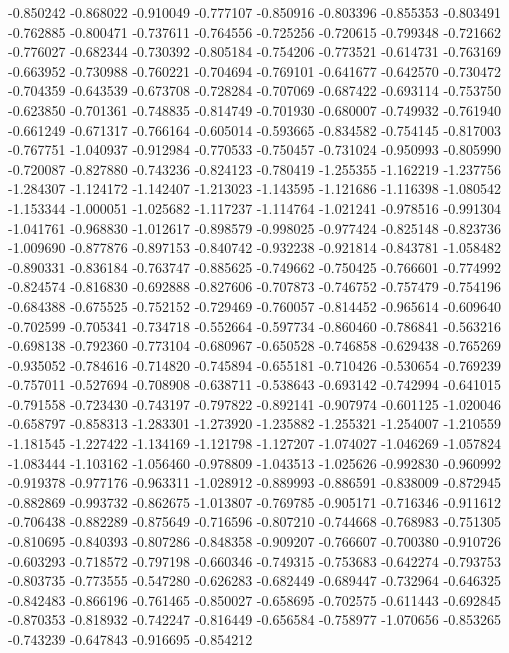 -0.850242
-0.868022
-0.910049
-0.777107
-0.850916
-0.803396
-0.855353
-0.803491
-0.762885
-0.800471
-0.737611
-0.764556
-0.725256
-0.720615
-0.799348
-0.721662
-0.776027
-0.682344
-0.730392
-0.805184
-0.754206
-0.773521
-0.614731
-0.763169
-0.663952
-0.730988
-0.760221
-0.704694
-0.769101
-0.641677
-0.642570
-0.730472
-0.704359
-0.643539
-0.673708
-0.728284
-0.707069
-0.687422
-0.693114
-0.753750
-0.623850
-0.701361
-0.748835
-0.814749
-0.701930
-0.680007
-0.749932
-0.761940
-0.661249
-0.671317
-0.766164
-0.605014
-0.593665
-0.834582
-0.754145
-0.817003
-0.767751
-1.040937
-0.912984
-0.770533
-0.750457
-0.731024
-0.950993
-0.805990
-0.720087
-0.827880
-0.743236
-0.824123
-0.780419
-1.255355
-1.162219
-1.237756
-1.284307
-1.124172
-1.142407
-1.213023
-1.143595
-1.121686
-1.116398
-1.080542
-1.153344
-1.000051
-1.025682
-1.117237
-1.114764
-1.021241
-0.978516
-0.991304
-1.041761
-0.968830
-1.012617
-0.898579
-0.998025
-0.977424
-0.825148
-0.823736
-1.009690
-0.877876
-0.897153
-0.840742
-0.932238
-0.921814
-0.843781
-1.058482
-0.890331
-0.836184
-0.763747
-0.885625
-0.749662
-0.750425
-0.766601
-0.774992
-0.824574
-0.816830
-0.692888
-0.827606
-0.707873
-0.746752
-0.757479
-0.754196
-0.684388
-0.675525
-0.752152
-0.729469
-0.760057
-0.814452
-0.965614
-0.609640
-0.702599
-0.705341
-0.734718
-0.552664
-0.597734
-0.860460
-0.786841
-0.563216
-0.698138
-0.792360
-0.773104
-0.680967
-0.650528
-0.746858
-0.629438
-0.765269
-0.935052
-0.784616
-0.714820
-0.745894
-0.655181
-0.710426
-0.530654
-0.769239
-0.757011
-0.527694
-0.708908
-0.638711
-0.538643
-0.693142
-0.742994
-0.641015
-0.791558
-0.723430
-0.743197
-0.797822
-0.892141
-0.907974
-0.601125
-1.020046
-0.658797
-0.858313
-1.283301
-1.273920
-1.235882
-1.255321
-1.254007
-1.210559
-1.181545
-1.227422
-1.134169
-1.121798
-1.127207
-1.074027
-1.046269
-1.057824
-1.083444
-1.103162
-1.056460
-0.978809
-1.043513
-1.025626
-0.992830
-0.960992
-0.919378
-0.977176
-0.963311
-1.028912
-0.889993
-0.886591
-0.838009
-0.872945
-0.882869
-0.993732
-0.862675
-1.013807
-0.769785
-0.905171
-0.716346
-0.911612
-0.706438
-0.882289
-0.875649
-0.716596
-0.807210
-0.744668
-0.768983
-0.751305
-0.810695
-0.840393
-0.807286
-0.848358
-0.909207
-0.766607
-0.700380
-0.910726
-0.603293
-0.718572
-0.797198
-0.660346
-0.749315
-0.753683
-0.642274
-0.793753
-0.803735
-0.773555
-0.547280
-0.626283
-0.682449
-0.689447
-0.732964
-0.646325
-0.842483
-0.866196
-0.761465
-0.850027
-0.658695
-0.702575
-0.611443
-0.692845
-0.870353
-0.818932
-0.742247
-0.816449
-0.656584
-0.758977
-1.070656
-0.853265
-0.743239
-0.647843
-0.916695
-0.854212
